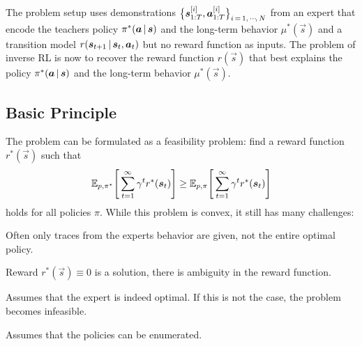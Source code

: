 		The problem setup uses demonstrations \( \big\{ \bm{s}_{1:T}^{[i]}, \bm{a}_{1:T}^{[i]} \big\}_{i \,=\, 1,\,\cdots\!,\,N} \) from an expert that encode the teachers policy \( \pi^\ast(\bm{a} \,\vert\, \bm{s}) \) and the long-term behavior \( \mu^\ast(\vec{s}) \) and a transition model \( r(\bm{s}_{t + 1} \,\vert\, \bm{s}_t, \bm{a}_t) \) but no reward function as inputs. The problem of inverse RL is now to recover the reward function \( r(\vec{s}) \) that best explains the policy \( \pi^\ast(\bm{a} \,\vert\, \bm{s}) \) and the long-term behavior \( \mu^\ast(\vec{s}) \).

		\subsection{Basic Principle}
			The problem can be formulated as a feasibility problem: find a reward function \( r^\ast(\vec{s}) \) such that
			\begin{equation}
				\mathbb{E}_{p, \pi^\ast}\Bigg[ \sum_{t = 1}^{\infty} \gamma^t r^\ast(\bm{s}_t) \Bigg]
				\geq
				\mathbb{E}_{p, \pi}\Bigg[ \sum_{t = 1}^{\infty} \gamma^t r^\ast(\bm{s}_t) \Bigg]
				\label{eq:inverseRLBasicPrinciple}
			\end{equation}
			holds for all policies \(\pi\). While this problem is convex, it still has many challenges:
			\begin{description}[leftmargin=4.5cm]
				\item[Limited Data]         Often only traces from the experts behavior are given, not the entire optimal policy.
				\item[Ill-Posed]            Reward \( r^\ast(\vec{s}) \equiv 0 \) is a solution, there is ambiguity in the reward function.
				\item[Expert Suboptimality] Assumes that the expert is indeed optimal. If this is not the case, the problem becomes infeasible.
				\item[Computation]          Assumes that the policies can be enumerated.
			\end{description}


